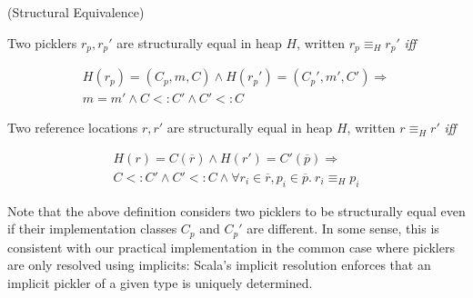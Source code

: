 \documentclass[10pt]{sigplanconf}
\theoremstyle{definition}
\theoremstyle{definition}
\newcommand{\sub}{<:}
\newcommand{\seq}[1]{\overline{#1}}
\newcommand{\sreducestar}[6]{#1, #2, #3 \;\longrightarrow^{\ast}\; #4, #5, #6}
\begin{document}
\begin{defn}(Structural Equivalence)

Two picklers $r_p,r_p'$ are structurally equal in heap $H$, written $r_p \equiv_{H} r_p'$
{\em iff}

\begin{equation}
\begin{split}
H(r_p) = (C_p, m, C) \land H(r_p') = (C_p', m', C') \Rightarrow \\
m = m' \land C <: C' \land C' <: C
\end{split}
\end{equation}

Two reference locations $r,r'$ are structurally equal in heap $H$, written $r \equiv_{H} r'$ {\em iff}

\begin{equation}
\begin{split}
H(r) = C(\seq{r}) \land H(r') = C'(\seq{p}) \Rightarrow \\
C <: C' \land C' <: C \land \forall r_i \in \seq{r}, p_i \in \seq{p}.~r_i \equiv_{H} p_i
\end{split}
\end{equation}

\end{defn}

Note that the above definition considers two picklers to be structurally equal
even if their implementation classes $C_p$ and $C_p'$ are different. In some
sense, this is consistent with our practical implementation in the common case
where picklers are only resolved using implicits: Scala's implicit resolution
enforces that an implicit pickler of a given type is uniquely determined.








\end{document}

